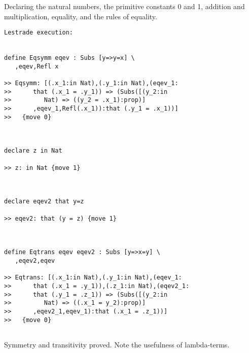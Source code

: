 \documentclass{article}
\begin{document}
Declaring the natural numbers, the primitive constants 0 and 1, addition and multiplication, equality, and the rules of equality.

\begin{verbatim}Lestrade execution:


define Eqsymm eqev : Subs [y=>y=x] \
   ,eqev,Refl x

>> Eqsymm: [(.x_1:in Nat),(.y_1:in Nat),(eqev_1:
>>      that (.x_1 = .y_1)) => (Subs([(y_2:in
>>         Nat) => ((y_2 = .x_1):prop)]
>>      ,eqev_1,Refl(.x_1)):that (.y_1 = .x_1))]
>>   {move 0}



declare z in Nat

>> z: in Nat {move 1}



declare eqev2 that y=z

>> eqev2: that (y = z) {move 1}



define Eqtrans eqev eqev2 : Subs [y=>x=y] \
   ,eqev2,eqev

>> Eqtrans: [(.x_1:in Nat),(.y_1:in Nat),(eqev_1:
>>      that (.x_1 = .y_1)),(.z_1:in Nat),(eqev2_1:
>>      that (.y_1 = .z_1)) => (Subs([(y_2:in
>>         Nat) => ((.x_1 = y_2):prop)]
>>      ,eqev2_1,eqev_1):that (.x_1 = .z_1))]
>>   {move 0}


\end{verbatim}

Symmetry and transitivity proved.  Note the usefulness of lambda-terms.
\end{document}
